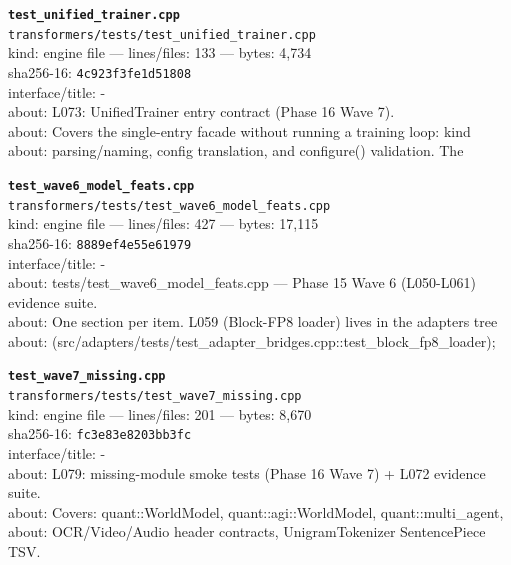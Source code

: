 \noindent\textbf{\texttt{test\_unified\_trainer.cpp}}\\
\texttt{transformers/tests/test\_unified\_trainer.cpp}\\
kind: engine file --- lines/files: 133 --- bytes: 4,734\\
sha256-16: \texttt{4c923f3fe1d51808}\\
interface/title: -\\
about: L073: UnifiedTrainer entry contract (Phase 16 Wave 7).\\
about: Covers the single-entry facade without running a training loop: kind\\
about: parsing/naming, config translation, and configure() validation. The\\
\vspace*{6.0pt}

\noindent\textbf{\texttt{test\_wave6\_model\_feats.cpp}}\\
\texttt{transformers/tests/test\_wave6\_model\_feats.cpp}\\
kind: engine file --- lines/files: 427 --- bytes: 17,115\\
sha256-16: \texttt{8889ef4e55e61979}\\
interface/title: -\\
about: tests/test\_wave6\_model\_feats.cpp — Phase 15 Wave 6 (L050-L061) evidence suite.\\
about: One section per item. L059 (Block-FP8 loader) lives in the adapters tree\\
about: (src/adapters/tests/test\_adapter\_bridges.cpp::test\_block\_fp8\_loader);\\
\vspace*{6.0pt}

\noindent\textbf{\texttt{test\_wave7\_missing.cpp}}\\
\texttt{transformers/tests/test\_wave7\_missing.cpp}\\
kind: engine file --- lines/files: 201 --- bytes: 8,670\\
sha256-16: \texttt{fc3e83e8203bb3fc}\\
interface/title: -\\
about: L079: missing-module smoke tests (Phase 16 Wave 7) + L072 evidence suite.\\
about: Covers: quant::WorldModel, quant::agi::WorldModel, quant::multi\_agent,\\
about: OCR/Video/Audio header contracts, UnigramTokenizer SentencePiece TSV.\\
\vspace*{6.0pt}

